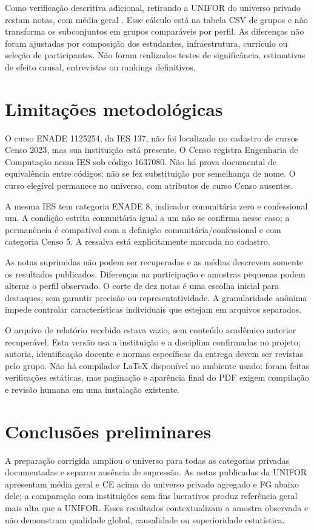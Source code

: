 \documentclass[12pt,a4paper]{article}
\begin{document}
Como verificação descritiva adicional, retirando a UNIFOR do universo privado
restam \NotasSemUnifor{} notas, com média geral \MediaSemUniforGeral{}.
Esse cálculo está na tabela CSV de grupos e não transforma os subconjuntos
em grupos comparáveis por perfil. As diferenças não foram ajustadas por
composição dos estudantes, infraestrutura, currículo ou seleção de participantes.
Não foram realizados testes de significância, estimativas de efeito causal,
entrevistas ou rankings definitivos.

\section{Limitações metodológicas}
O curso ENADE 1125254, da IES 137, não foi localizado no cadastro de cursos
Censo 2023, mas sua instituição está presente. O Censo registra Engenharia de
Computação nessa IES sob código 1637080. Não há prova documental de equivalência
entre códigos; não se fez substituição por semelhança de nome. O curso elegível
permanece no universo, com atributos de curso Censo ausentes.

A mesma IES tem categoria ENADE 8, indicador comunitária zero e confessional
um. A condição estrita comunitária igual a um não se confirma nesse caso;
a permanência é compatível com a definição comunitária/confessional e com
categoria Censo 5. A ressalva está explicitamente marcada no cadastro.

As notas suprimidas não podem ser recuperadas e as médias descrevem somente
os resultados publicados. Diferenças na participação e amostras pequenas podem
alterar o perfil observado. O corte de dez notas é uma escolha inicial para
destaques, sem garantir precisão ou representatividade. A granularidade anônima
impede controlar características individuais que estejam em arquivos separados.

O arquivo de relatório recebido estava vazio, sem conteúdo acadêmico anterior
recuperável. Esta versão usa a instituição e a disciplina confirmadas no projeto;
autoria, identificação docente e normas específicas da entrega devem ser revistas
pelo grupo. Não há compilador LaTeX disponível no ambiente usado: foram feitas
verificações estáticas, mas paginação e aparência final do PDF exigem compilação
e revisão humana em uma instalação existente.

\section{Conclusões preliminares}
A preparação corrigida ampliou o universo para todas as categorias privadas
documentadas e separou ausência de supressão. As notas publicadas da UNIFOR
apresentam média geral e CE acima do universo privado agregado e FG abaixo dele;
a comparação com instituições sem fins lucrativos produz referência geral mais
alta que a UNIFOR. Esses resultados contextualizam a amostra observada e não
demonstram qualidade global, causalidade ou superioridade estatística.
\end{document}
